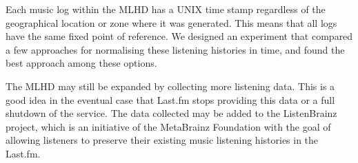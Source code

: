 Each music log within the MLHD has a UNIX time stamp regardless of the geographical location or zone where it was generated. 
This means that all logs have the same fixed point of reference.
We designed an experiment that compared a few approaches for normalising these listening histories in time, and found the best approach among these options.

The MLHD may still be expanded by collecting more listening data. This is a good idea in the eventual case that Last.fm stops providing this data or a full shutdown of the service. The data collected may be added to the ListenBrainz project, which is an initiative of the MetaBrainz Foundation with the goal of allowing listeners to preserve their existing music listening histories in the Last.fm. 



